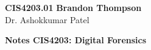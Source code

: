 \noindent
\textbf{CIS4203.01} \hfill \textbf{Brandon Thompson} \\
\normalsize Dr. Ashokkumar Patel\\

\begin{center}
\textbf{Notes CIS4203: Digital Forensics}
\end{center}